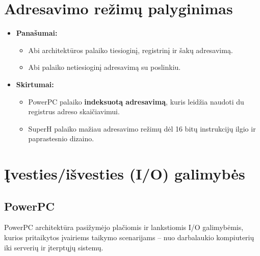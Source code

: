 \documentclass{article}
\begin{document}
\section*{Adresavimo režimų palyginimas}
\begin{itemize}
    \item \textbf{Panašumai:}
        \begin{itemize}
            \item Abi architektūros palaiko tiesioginį, registrinį ir šakų adresavimą.
            \item Abi palaiko netiesioginį adresavimą su poslinkiu.
        \end{itemize}
    \item \textbf{Skirtumai:}
        \begin{itemize}
            \item PowerPC palaiko \textbf{indeksuotą adresavimą}, kuris leidžia naudoti du registrus adreso skaičiavimui.
            \item SuperH palaiko mažiau adresavimo režimų dėl 16 bitų instrukcijų ilgio ir paprastesnio dizaino.
        \end{itemize}
\end{itemize}

\section{Įvesties/išvesties (I/O) galimybės}
\subsection{PowerPC}
PowerPC architektūra pasižymėjo plačiomis ir lankstiomis I/O galimybėmis, kurios pritaikytos įvairiems taikymo scenarijams – nuo darbalaukio kompiuterių iki serverių ir įterptųjų sistemų.
\end{document}
